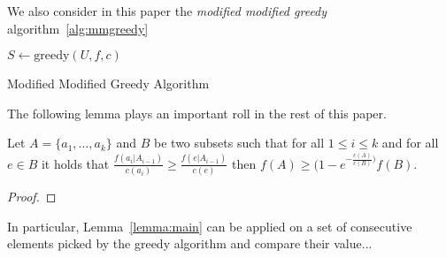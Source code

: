 We also consider in this paper the \emph{modified modified greedy} algorithm~\ref{alg:mmgreedy}

\begin{algorithm}[H]
\label{alg:mmgreedy}



$S \leftarrow \text{greedy}(U, f, c)$
\\
\caption{Modified Modified Greedy Algorithm}
\end{algorithm}

The following lemma plays an important roll in the rest of this paper.

\begin{lemma}
\label{lemma:main}
Let $A = \{a_1, \dots, a_k\}$ and $B$ be two subsets such that for all $1 \leq i \leq k$ 
and for all $e \in B$ it holds that 
$\frac{f(a_i|A_{i-1})}{c(a_i)} \geq \frac{f(e|A_{i-1})}{c(e)}$
then $f(A) \geq (1 - e^{-\frac{c(A)}{c(B)})}f(B)$.
\end{lemma} 

\begin{proof}
\end{proof}


In particular, Lemma~\ref{lemma:main} can be applied on a set of consecutive 
elements picked by the greedy algorithm and compare their value...   




